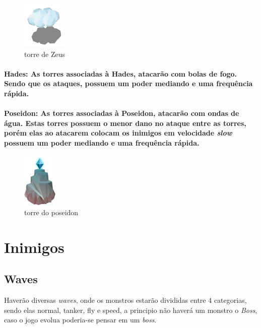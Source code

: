 \documentclass[11pt]{article} %
\begin{document}
\begin{figure}[!htp]
\centering
\includegraphics[scale=1.3]{res/characters/zeus_tower.png}
\caption{torre de Zeus}
\label{satiro}
\end{figure}

\paragraph{{\Large Hades}: As torres associadas à Hades, atacarão com bolas de fogo. Sendo que os ataques, possuem um poder mediando e uma frequência rápida.}

\paragraph{{\Large Poseidon}: As torres associadas à Poseidon, atacarão com ondas de água. Estas torres possuem o menor dano no ataque entre as torres, porém elas ao atacarem colocam os inimigos em velocidade \textit{slow} possuem um poder mediando e uma frequência rápida.}

\begin{figure}[!htp]
\centering
\includegraphics[scale=1.3]{res/characters/poseidon_tower.png}
\caption{torre do poseidon}
\label{satiro}
\end{figure}



\section{Inimigos}
\subsection{Waves} 

Haverão diversas \textit{waves}, onde os monstros estarão divididas entre 4 categorias, sendo elas normal, tanker, fly e  speed, a principio não haverá um monstro o \textit{Boss}, caso o jogo evolua poderia-se pensar em um \textit{boss}.
\end{document}
